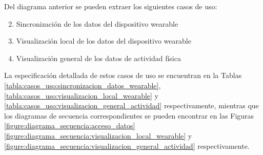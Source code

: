             Del diagrama anterior se pueden extraer los siguientes casos de uso:

            \begin{enumerate}[series=casos-uso,label=\textbf{\texttt{CU-\arabic*}}]
                \setcounter{enumi}{1}
                \item \label{disenio:casos_uso:sincronizacion_datos_wearable} Sincronización de los datos del dispositivo \gls{wearable}
                \item \label{disenio:casos_uso:visualizacion_local_wearable} Visualización local de los datos del dispositivo \gls{wearable}
                \item \label{disenio:casos_uso:visualizacion_general_actividad} Visualización general de los datos de actividad física
            \end{enumerate}
            
            La especificación detallada de estos casos de uso se encuentran en la Tablas \ref{tabla:casos_uso:sincronizacion_datos_wearable}, \ref{tabla:casos_uso:visualizacion_local_wearable} y \ref{tabla:casos_uso:visualizacion_general_actividad} respectivamente, mientras que los diagramas de secuencia correspondientes se pueden encontrar en las Figuras \ref{figure:diagrama_secuencia:acceso_datos} \ref{figure:diagrama_secuencia:visualizacion_local_wearable} y \ref{figure:diagrama_secuencia:visualizacion_general_actividad} respectivamente.



